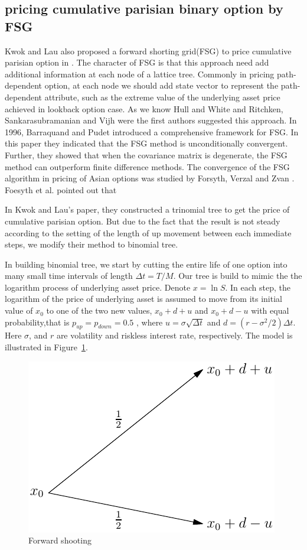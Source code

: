 \documentclass[11pt]{book}
\begin{document}
\subsection{pricing cumulative parisian binary option by FSG}
Kwok and Lau also proposed a forward shorting grid(FSG) to price cumulative parisian option in \cite{Kwok2001}. The character of FSG is that this approach need add additional information at each node of  a lattice tree. Commonly in pricing path-dependent option, at each node we should add state vector to represent the path-dependent attribute, such as the extreme value of the underlying asset price achieved in lookback option case. As we know Hull and White \cite{Hull1993} and Ritchken, Sankarasubramanian and Vijh \cite{Vijh1993} were the first authors suggested this approach. In 1996, Barraquand and Pudet \cite{Barraquand1996} introduced a comprehensive framework for FSG. In this paper they indicated that the FSG method is unconditionally convergent. Further, they showed that when the covariance matrix is degenerate, the FSG method can outperform finite difference methods. The convergence of the FSG algorithm in pricing of Asian options was studied by Forsyth, Verzal and Zvan \cite{Forsyth1999}. Foesyth et al. pointed out that

 In Kwok and Lau's paper\cite{Kwok2001}, they constructed a trinomial tree to get the price of cumulative parisian option. But due to the fact that the result is not steady according to the setting of the length of up movement between each immediate steps, we modify their method to binomial tree.

In building binomial tree, we start by cutting the entire life of one option into many small time intervals of length $\Delta t = T / M$.
Our tree is build to mimic the the logarithm process of underlying asset price. Denote $x=\ln S$. In each step, the logarithm of the price of underlying asset is assumed to move from its initial value of $x_0$ to one of the two new values, $x_0 + d + u$ and $x_0 + d - u$ with equal probability,that is $p_{up} = p_{down} = 0.5$ , where $u = \sigma \sqrt{\Delta t}$ and $d = (r - {\sigma}^2 /2)\Delta t$. Here $\sigma$, and $r$ are volatility and riskless interest rate, respectively. The model is illustrated in Figure~\ref{fig:tree1}.
\begin{figure}[htbp]
   \centering
   \includegraphics{trees.pdf} %
   \caption{Forward shooting}
   \label{fig:tree1}
\end{figure}
\end{document}
